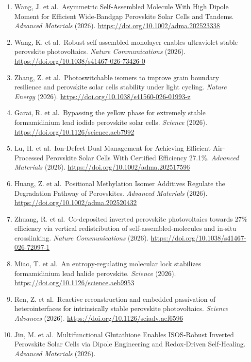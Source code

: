 \documentclass[
  11pt,
]{article}
\providecommand{\tightlist}{%
  \setlength{\itemsep}{0pt}\setlength{\parskip}{0pt}}
\begin{document}
\begin{enumerate}
\def\labelenumi{\arabic{enumi}.}
\tightlist
\item
  Wang, J. et al.~Asymmetric Self‐Assembled Molecule With High Dipole
  Moment for Efficient Wide‐Bandgap Perovskite Solar Cells and Tandems.
  \emph{Advanced Materials} (2026).
  \url{https://doi.org/10.1002/adma.202523338}
\item
  Wang, K. et al.~Robust self-assembled monolayer enables ultraviolet
  stable perovskite photovoltaics. \emph{Nature Communications} (2026).
  \url{https://doi.org/10.1038/s41467-026-73426-0}
\item
  Zhang, Z. et al.~Photoswitchable isomers to improve grain boundary
  resilience and perovskite solar cells stability under light cycling.
  \emph{Nature Energy} (2026).
  \url{https://doi.org/10.1038/s41560-026-01993-z}
\item
  Garai, R. et al.~Bypassing the yellow phase for extremely stable
  formamidinium lead iodide perovskite solar cells. \emph{Science}
  (2026). \url{https://doi.org/10.1126/science.aeb7992}
\item
  Lu, H. et al.~Ion‐Defect Dual Management for Achieving Efficient
  Air‐Processed Perovskite Solar Cells With Certified Efficiency 27.1\%.
  \emph{Advanced Materials} (2026).
  \url{https://doi.org/10.1002/adma.202517596}
\item
  Huang, Z. et al.~Positional Methylation Isomer Additives Regulate the
  Degradation Pathway of Perovskites. \emph{Advanced Materials} (2026).
  \url{https://doi.org/10.1002/adma.202520432}
\item
  Zhuang, R. et al.~Co-deposited inverted perovskite photovoltaics
  towards 27\% efficiency via vertical redistribution of
  self-assembled-molecules and in-situ crosslinking. \emph{Nature
  Communications} (2026).
  \url{https://doi.org/10.1038/s41467-026-72097-1}
\item
  Miao, T. et al.~An entropy-regulating molecular lock stabilizes
  formamidinium lead halide perovskite. \emph{Science} (2026).
  \url{https://doi.org/10.1126/science.aeb9953}
\item
  Ren, Z. et al.~Reactive reconstruction and embedded passivation of
  heterointerfaces for intrinsically stable perovskite photovoltaics.
  \emph{Science Advances} (2026).
  \url{https://doi.org/10.1126/sciadv.aef6596}
\item
  Jin, M. et al.~Multifunctional Glutathione Enables ISOS‐Robust
  Inverted Perovskite Solar Cells via Dipole Engineering and
  Redox‐Driven Self‐Healing. \emph{Advanced Materials} (2026).

\end{enumerate}
\end{document}
